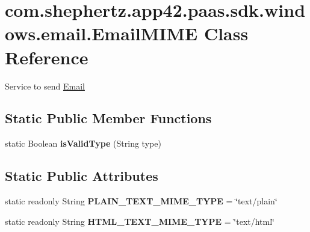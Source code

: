 \hypertarget{classcom_1_1shephertz_1_1app42_1_1paas_1_1sdk_1_1windows_1_1email_1_1_email_m_i_m_e}{\section{com.\+shephertz.\+app42.\+paas.\+sdk.\+windows.\+email.\+Email\+M\+I\+M\+E Class Reference}
\label{classcom_1_1shephertz_1_1app42_1_1paas_1_1sdk_1_1windows_1_1email_1_1_email_m_i_m_e}
}


Service to send \hyperlink{classcom_1_1shephertz_1_1app42_1_1paas_1_1sdk_1_1windows_1_1email_1_1_email}{Email}  


\subsection*{Static Public Member Functions}
\begin{DoxyCompactItemize}
\item 
\hypertarget{classcom_1_1shephertz_1_1app42_1_1paas_1_1sdk_1_1windows_1_1email_1_1_email_m_i_m_e_a33981941f996f0cce503c53059fd8447}{static Boolean {\bfseries is\+Valid\+Type} (String type)}\label{classcom_1_1shephertz_1_1app42_1_1paas_1_1sdk_1_1windows_1_1email_1_1_email_m_i_m_e_a33981941f996f0cce503c53059fd8447}

\end{DoxyCompactItemize}
\subsection*{Static Public Attributes}
\begin{DoxyCompactItemize}
\item 
\hypertarget{classcom_1_1shephertz_1_1app42_1_1paas_1_1sdk_1_1windows_1_1email_1_1_email_m_i_m_e_a406f3d573fdb213450ea5bb9bb0e68fa}{static readonly String {\bfseries P\+L\+A\+I\+N\+\_\+\+T\+E\+X\+T\+\_\+\+M\+I\+M\+E\+\_\+\+T\+Y\+P\+E} = \char`\"{}text/plain\char`\"{}}\label{classcom_1_1shephertz_1_1app42_1_1paas_1_1sdk_1_1windows_1_1email_1_1_email_m_i_m_e_a406f3d573fdb213450ea5bb9bb0e68fa}

\item 
\hypertarget{classcom_1_1shephertz_1_1app42_1_1paas_1_1sdk_1_1windows_1_1email_1_1_email_m_i_m_e_a995751285f26750b77591ea0b67432df}{static readonly String {\bfseries H\+T\+M\+L\+\_\+\+T\+E\+X\+T\+\_\+\+M\+I\+M\+E\+\_\+\+T\+Y\+P\+E} = \char`\"{}text/html\char`\"{}}\label{classcom_1_1shephertz_1_1app42_1_1paas_1_1sdk_1_1windows_1_1email_1_1_email_m_i_m_e_a995751285f26750b77591ea0b67432df}

\end{DoxyCompactItemize}



